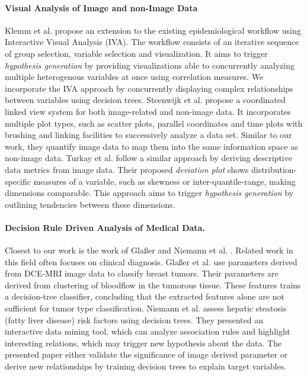 \documentclass[a4paper,twoside]{style/article}
\begin{document}
\paragraph{Visual Analysis of Image and non-Image Data}
Klemm et al. \cite{Klemm2014VIS} propose an extension to the existing epidemiological workflow using Interactive Visual Analysis (IVA).
The workflow consists of an iterative sequence of group selection, variable selection and visualization.
It aims to trigger \emph{hypothesis generation} by providing visualizations able to concurrently analyzing multiple heterogenous variables at once using correlation measures.
We incorporate the IVA approach by concurrently displaying complex relationships between variables using decision trees.
Steenwijk et al. \cite{Steenwijk} propose a coordinated linked view system for both image-related and non-image data.
It incorporates multiple plot types, such as scatter plots, parallel coordinates and time plots with brushing and linking facilities to successively analyze a data set.
Similar to our work, they quantify image data to map them into the same information space as non-image data.
Turkay et al. \cite{Turkay} follow a similar approach by deriving descriptive data metrics from image data.
Their proposed \emph{deviation plot} shows distribution-specific measures of a variable, such as skewness or inter-quantile-range, making dimensions comparable.
This approach aims to trigger \emph{hypothesis generation} by outlining tendencies between these dimensions.

\paragraph{Decision Rule Driven Analysis of Medical Data.}
Closest to our work is the work of Gla{\ss}er \cite{Glasser2013} and Niemann et al. \cite{Niemann2014}.
Related work in this field often focuses on clinical diagnosis.
Gla{\ss}er et al. \cite{Glasser2013} use parameters derived from DCE-MRI image data to classify breast tumors.
Their parameters are derived from clustering of bloodflow in the tumorous tissue.
These features trains a decision-tree classifier, concluding that the extracted features alone are not sufficient for tumor type classification.
Niemann et al. \cite{Niemann2014} assess hepatic steatosis (fatty liver disease) risk factors using decision trees.
They presented an interactive data mining tool, which can analyze association rules and highlight interesting relations, which may trigger new hypothesis about the data.
The presented paper either validate the significance of image derived parameter or derive new relationships by training decision trees to explain target variables.
\end{document}

